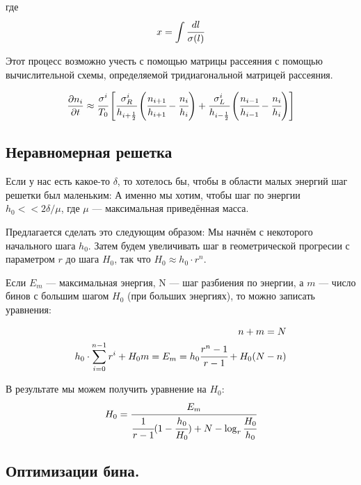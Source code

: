 \documentclass[a4paper, 14pt]{article}
\begin{document}
где 
\begin{equation*}
	x = \int{\cfrac{dl}{\sigma(l)}}
\end{equation*}

Этот процесс возможно учесть с помощью матрицы рассеяния с помощью вычислительной схемы, определяемой тридиагональной матрицей рассеяния.

\begin{equation*}
	\frac{\partial n_i}{\partial t} \approx  \cfrac{\sigma^i}{T_0} 
	\left[\cfrac{\sigma^i_R}{h_{i+\frac{1}{2}}} 
		\left(\cfrac{n_{i+1}}{h_{i+1}}-\cfrac{n_{i}}{h_{i}}\right) +
		\cfrac{\sigma^i_L}{h_{i-\frac{1}{2}}}
		\left(\cfrac{n_{i-1}}{h_{i-1}}-\cfrac{n_{i}}{h_{i}}\right) 
	\right]
\end{equation*}

\subsection{Неравномерная решетка}
Если у нас есть какое-то $\delta$, то хотелось бы, чтобы в области малых энергий шаг решетки был маленьким: А именно мы хотим, чтобы шаг по энергии $h_0 << 2\delta/\mu$, где $\mu$ --- максимальная приведённая масса. 

Предлагается сделать это следующим образом:
Мы начнём с некоторого начального шага $h_0$. Затем будем увеличивать шаг в геометрической прогресии с параметром $r$ до шага $H_0$, так что $H_0 \approx h_0\cdot r^n$.

Если $E_{m}$ --- максимальная энергия, N --- шаг разбиения по энергии, а $m$ --- число бинов с большим шагом $H_0$ (при больших энергиях), то можно записать уравнения:

\begin{eqnarray*}
	n+m = N \\
	h_0 \cdot \sum_{i=0}^{n-1}{r^i} + H_0 m = E_{m} = h_0 \cfrac{r^n-1}{r-1} + H_0 (N-n)
\end{eqnarray*}

В результате мы можем получить уравнение на $H_0$:
\begin{equation*}
	H_0 = \cfrac{E_m}{ \cfrac{1}{r-1} (1-\cfrac{h_0}{H_0}) + N - \log_{r}{\cfrac{H_0}{h_0}}}
\end{equation*}

\subsection{Оптимизации бина.}
%
\end{document}

